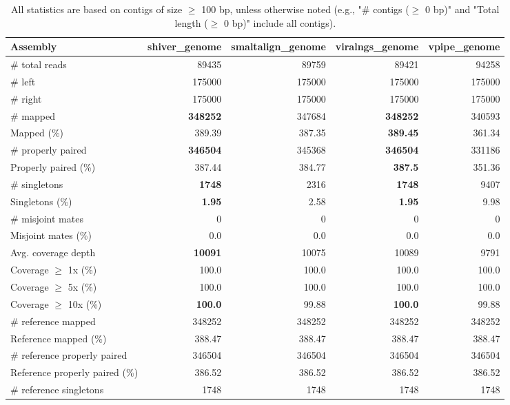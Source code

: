 \documentclass[12pt,a4paper]{article}
\begin{document}
\begin{table}[ht]
\begin{center}
\caption{All statistics are based on contigs of size $\geq$ 100 bp, unless otherwise noted (e.g., "\# contigs ($\geq$ 0 bp)" and "Total length ($\geq$ 0 bp)" include all contigs).}
\begin{tabular}{|l*{4}{|r}|}
\hline
Assembly & shiver\_genome & smaltalign\_genome & viralngs\_genome & vpipe\_genome \\ \hline
\# total reads & 89435 & 89759 & 89421 & 94258 \\ \hline
\# left & 175000 & 175000 & 175000 & 175000 \\ \hline
\# right & 175000 & 175000 & 175000 & 175000 \\ \hline
\# mapped & {\bf 348252} & 347684 & {\bf 348252} & 340593 \\ \hline
Mapped (\%) & 389.39 & 387.35 & {\bf 389.45} & 361.34 \\ \hline
\# properly paired & {\bf 346504} & 345368 & {\bf 346504} & 331186 \\ \hline
Properly paired (\%) & 387.44 & 384.77 & {\bf 387.5} & 351.36 \\ \hline
\# singletons & {\bf 1748} & 2316 & {\bf 1748} & 9407 \\ \hline
Singletons (\%) & {\bf 1.95} & 2.58 & {\bf 1.95} & 9.98 \\ \hline
\# misjoint mates & 0 & 0 & 0 & 0 \\ \hline
Misjoint mates (\%) & 0.0 & 0.0 & 0.0 & 0.0 \\ \hline
Avg. coverage depth & {\bf 10091} & 10075 & 10089 & 9791 \\ \hline
Coverage $\geq$ 1x (\%) & 100.0 & 100.0 & 100.0 & 100.0 \\ \hline
Coverage $\geq$ 5x (\%) & 100.0 & 100.0 & 100.0 & 100.0 \\ \hline
Coverage $\geq$ 10x (\%) & {\bf 100.0} & 99.88 & {\bf 100.0} & 99.88 \\ \hline
\# reference mapped & 348252 & 348252 & 348252 & 348252 \\ \hline
Reference mapped (\%) & 388.47 & 388.47 & 388.47 & 388.47 \\ \hline
\# reference properly paired & 346504 & 346504 & 346504 & 346504 \\ \hline
Reference properly paired (\%) & 386.52 & 386.52 & 386.52 & 386.52 \\ \hline
\# reference singletons & 1748 & 1748 & 1748 & 1748 \\ \hline

\end{tabular}
\end{center}
\end{table}
\end{document}
